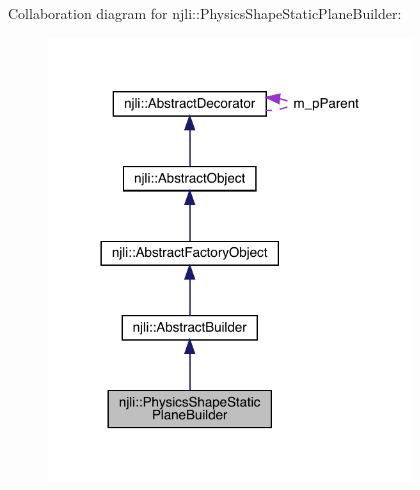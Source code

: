 Collaboration diagram for njli\+:\+:Physics\+Shape\+Static\+Plane\+Builder\+:\nopagebreak
\begin{figure}[H]
\begin{center}
\leavevmode
\includegraphics[width=273pt]{classnjli_1_1_physics_shape_static_plane_builder__coll__graph}
\end{center}
\end{figure}
